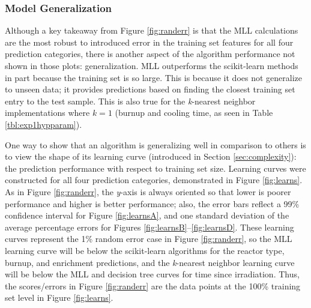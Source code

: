 
\subsubsection{Model Generalization}

Although a key takeaway from Figure \ref{fig:randerr} is that the \gls{MLL}
calculations are the most robust to introduced error in the training set
features for all four prediction categories, there is another aspect of the
algorithm performance not shown in those plots: generalization. \Gls{MLL}
outperforms the scikit-learn methods in part because the training set is so
large. This is because it does not generalize to unseen data; it provides
predictions based on finding the closest training set entry to the test sample.
This is also true for the \textit{k}-nearest neighbor implementations where
$k=1$ (burnup and cooling time, as seen in Table \ref{tbl:exp1hypparam}).

One way to show that an algorithm is generalizing well in comparison to others
is to view the shape of its learning curve (introduced in Section
\ref{sec:complexity}): the prediction performance with respect to training set
size.  Learning curves were constructed for all four prediction categories,
demonstrated in Figure \ref{fig:learns}. As in Figure \ref{fig:randerr}, the
\textit{y}-axis is always oriented so that lower is poorer performance and
higher is better performance; also, the error bars reflect a 99\% confidence
interval for Figure \ref{fig:learnsA}, and one standard deviation of the
average percentage errors for Figures \ref{fig:learnsB}--\ref{fig:learnsD}.
These learning curves represent the 1\% random error case in Figure
\ref{fig:randerr}, so the \gls{MLL} learning curve will be below the
scikit-learn algorithms for the reactor type, burnup, and enrichment
predictions, and the \textit{k}-nearest neighbor learning curve will be below
the \gls{MLL} and decision tree curves for time since irradiation.  Thus, the
scores/errors in Figure \ref{fig:randerr} are the data points at the 100\%
training set level in Figure \ref{fig:learns}.  

